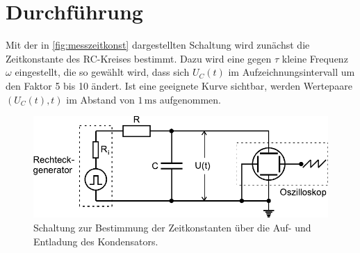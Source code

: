 \section{Durchführung}
\label{sec:Durchführung}

Mit der in \autoref{fig:messzeitkonst} dargestellten Schaltung wird zunächst die Zeitkonstante des RC-Kreises bestimmt.
Dazu wird eine gegen $τ$ kleine Frequenz $ω$ eingestellt, die so gewählt wird, dass sich $U_C(t)$ im Aufzeichnungsintervall um den Faktor 5 bis 10 ändert.
Ist eine geeignete Kurve sichtbar, werden Wertepaare $(U_C(t),t)$ im Abstand von $1 \,\unit{\milli\second}$ aufgenommen. \\

\begin{figure}
    \centering
    \includegraphics{figures/Messung a) Schaltung.pdf}
    \caption{Schaltung zur Bestimmung der Zeitkonstanten über die Auf- und Entladung des Kondensators\cite{ap08}.}
    \label{fig:messzeitkonst}
\end{figure}